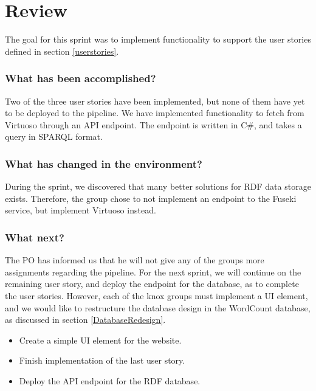 \section{Review}
The goal for this sprint was to implement functionality to support the user stories defined in section \ref{userstories}. 

\subsubsection*{What has been accomplished?}
Two of the three user stories have been implemented, but none of them have yet to be deployed to the \knox pipeline.
We have implemented functionality to fetch from Virtuoso through an API endpoint. The endpoint is written in C\#, and takes a query in SPARQL format. 

\subsubsection{What has changed in the environment?}
During the sprint, we discovered that many better solutions for RDF data storage exists. Therefore, the group chose to not implement an endpoint to the Fuseki service, but implement Virtuoso instead. 

\subsubsection*{What next?}
The PO has informed us that he will not give any of the \knox groups more assignments regarding the pipeline. 
For the next sprint, we will continue on the remaining user story, and deploy the endpoint for the database, as to complete the user stories. 
However, each of the knox groups must implement a UI element, and we would like to restructure the database design in the WordCount database, as discussed in section \ref{DatabaseRedesign}.

\begin{itemize}
    \item Create a simple UI element for the \knox website.
    \item Finish implementation of the last user story.
    \item Deploy the API endpoint for the RDF database.
\end{itemize}